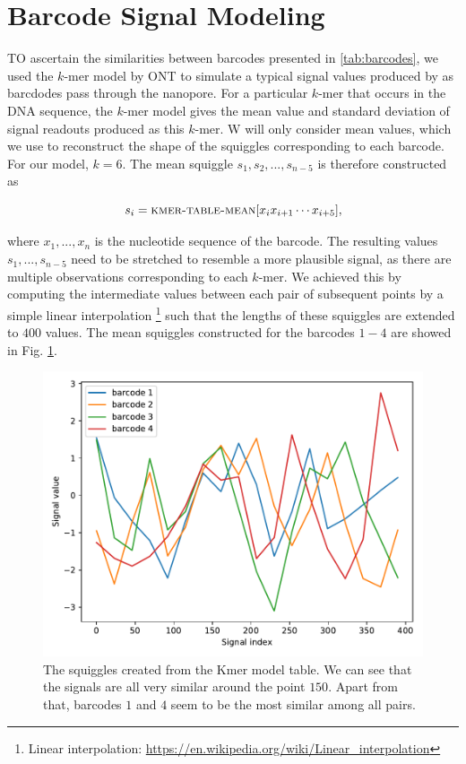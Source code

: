 \section{Barcode Signal Modeling}
TO ascertain the similarities between barcodes presented in \ref{tab:barcodes}, we used the $k$-mer model by ONT \cite{KmertablesONT} to simulate a typical signal values produced by as barcdodes pass through the nanopore. For a particular $k$-mer that occurs in the DNA sequence, the $k$-mer model gives the mean value and standard deviation of signal readouts produced as this $k$-mer. W will only consider mean values, which we use to reconstruct the shape of the squiggles corresponding to each barcode. For our model, $k = 6$. The mean squiggle $s_1, s_2, ..., s_{n-5}$ is therefore constructed as

$$s_i = \textsc{kmer-table-mean}[x_ix_{i+1}\cdots x_{i+5}],$$

where $x_1, ..., x_n$ is the nucleotide sequence of the barcode. The resulting values $s_1,...,s_{n-5}$ need to be stretched to resemble a more plausible signal, as there are multiple observations corresponding to each $k$-mer. We achieved this by computing the intermediate values between each pair of subsequent points by a simple linear interpolation \footnote{Linear interpolation: \url{https://en.wikipedia.org/wiki/Linear_interpolation}} such that the lengths of these squiggles are extended to $400$ values. The mean squiggles constructed for the barcodes $1-4$ are showed in Fig. \ref{fig:mean_barcodes}.

\begin{figure}[!ht]
    \centering
    \includegraphics[scale=0.8]{images/barcode_means.pdf}
    \caption[Mean barcode signals]{The squiggles created from the Kmer model table. We can see that the signals are all very similar around the point $150$. Apart from that, barcodes $1$ and $4$ seem to be the most similar among all pairs.}
    \label{fig:mean_barcodes}
\end{figure}

